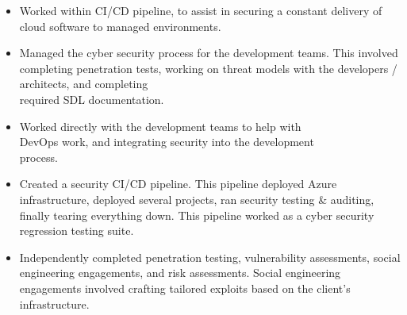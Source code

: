 \documentclass[10pt,a4paper,ragged2e]{rohrbach}
\begin{document}
\begin{paracol}{2}
\begin{itemize}
\item Worked within CI/CD pipeline, to assist in securing a constant \break delivery of cloud software to managed environments.
\item Managed the cyber security process for the development teams. This involved completing penetration tests, working on threat models with the developers / architects, and completing\\ required SDL documentation. 
\item Worked directly with the development teams to help with\\ DevOps work, and integrating security into the development\\ process.
\item Created a security CI/CD pipeline. This pipeline deployed Azure infrastructure, deployed several projects, ran security testing \& auditing, finally tearing everything down. This pipeline worked as a cyber security regression testing suite.
\end{itemize}




\begin{itemize}
\item Independently completed penetration testing, vulnerability \break assessments, social engineering engagements, and risk assessments. Social engineering engagements involved crafting tailored exploits based on the client’s infrastructure.
\end{itemize}


\end{paracol}
\end{document}
